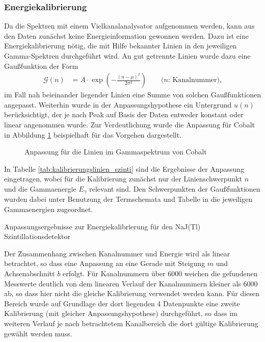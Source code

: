 \documentclass[11pt, a4paper]{article}
\numberwithin{equation}{section}
\begin{document}
\subsubsection{Energiekalibrierung}
\label{sec:kalibrierung_szinti}
Da die Spektren mit einem Vielkanalanalysator aufgenommen werden, kann aus den Daten zunächst keine Energieinformation gewonnen werden.
Dazu ist eine Energiekalibrierung nötig, die mit Hilfe bekannter Linien in den jeweiligen Gamma-Spektren durchgeführt wird.
An gut getrennte Linien wurde dazu eine Gaußfunktion der Form
\begin{align}
\mathcal{G}(n) &= A \cdot \exp\left( - \frac{(n - \mu)^2}{2 \sigma^2}\right) \qquad\text{($n$: Kanalnummer),}
\label{eq:gaussfithypothese}
\end{align}
im Fall nah beieinander liegender Linien eine Summe von solchen Gaußfunktionen angepasst.
Weiterhin wurde in der Anpassungshypothese ein Untergrund $u(n)$ berücksichtigt, der je nach Peak auf Basis der Daten entweder konstant oder linear angenommen wurde.
Zur Verdeutlichung wurde die Anpassung für Cobalt in Abbildung \ref{fig:fit_cobalt} beispielhaft für das Vorgehen dargestellt.
\begin{figure}[ht]
	\centering
	\resizebox{0.85\textwidth}{!}{
	
	}
	\caption{Anpassung für die Linien im Gammaspektrum von Cobalt}
	\label{fig:fit_cobalt}
\end{figure}
In Tabelle \ref{tab:kalibrierungslinien_szinti} sind die Ergebnisse der Anpassung eingetragen, wobei für die Kalibrierung zunächst nur der Linienschwerpunkt $n$ und die Gammaenergie $E_\gamma$ relevant sind.
Den Schwerpunkten der Gaußfunktionen wurden dabei unter Benutzung der Termschemata und Tabelle in \cite{anleitung} die jeweiligen Gammaenergien zugeordnet.
\begin{table}[ht]
	\centering
	
	\caption{Anpassungsergebnisse zur Energiekalibrierung für den NaJ(Tl) Szintillationsdetektor}
	\label{tab:kalibrierungslinien_szinti}
\end{table}
Der Zusammenhang zwischen Kanalnummer und Energie wird als linear betrachtet, so dass eine Anpassung an eine Gerade mit Steigung $m$ und Achsenabschnitt $b$ erfolgt.
Für Kanalnummern über \num{6000} weichen die gefundenen Messwerte deutlich von dem linearen Verlauf der Kanalnummern kleiner als \num{6000} ab, so dass hier nicht die gleiche Kalibrierung verwendet werden kann.
Für diesen Bereich wurde auf Grundlage der dort liegenden \num{4} Datenpunkte eine zweite Kalibrierung (mit gleicher Anpassungshypothese) durchgeführt, so dass im weiteren Verlauf je nach betrachtetem Kanalbereich die dort gültige Kalibrierung gewählt werden muss. 
\end{document}

